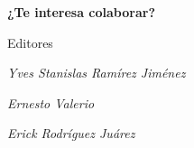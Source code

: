 \begin{tcolorbox}[
    colback=white,          %
    colframe=black,   
     boxrule=0.2mm,    %
    arc=0mm,                %
    width=0.7\textwidth,    %
    halign=center,          %
    valign=center,
    center                  %
]
    {\large\textbf{¿Te interesa colaborar?}}
    \vspace{0.2cm}

    
    \footnotesize
    {Editores}
    
    \vspace{0.1cm}
    {\textit{Yves Stanislas Ramírez Jiménez}}
    
    \vspace{0.1cm}
    {\textit{Ernesto Valerio }}

    \vspace{0.1cm}
    {\textit{Erick Rodríguez Juárez }}
\end{tcolorbox}
